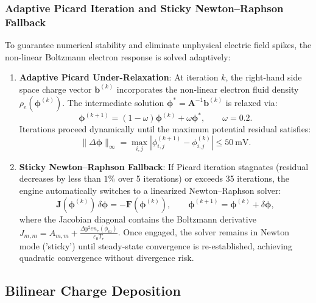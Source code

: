 \documentclass[11pt,a4paper]{article}
\begin{document}
\subsubsection{Adaptive Picard Iteration and Sticky Newton--Raphson Fallback}

To guarantee numerical stability and eliminate unphysical electric field spikes, the non-linear Boltzmann electron response is solved adaptively:
\begin{enumerate}[nosep]
    \item \textbf{Adaptive Picard Under-Relaxation}: At iteration $k$, the right-hand side space charge vector $\mathbf{b}^{(k)}$ incorporates the non-linear electron fluid density $\rho_e(\boldsymbol{\phi}^{(k)})$. The intermediate solution $\boldsymbol{\phi}^* = \mathbf{A}^{-1} \mathbf{b}^{(k)}$ is relaxed via:
    \begin{equation}
        \boldsymbol{\phi}^{(k+1)} = (1 - \omega) \boldsymbol{\phi}^{(k)} + \omega \boldsymbol{\phi}^*, \qquad \omega = 0.2.
    \end{equation}
    Iterations proceed dynamically until the maximum potential residual satisfies:
    \begin{equation}
        \|\Delta \boldsymbol{\phi}\|_{\infty} = \max_{i,j} \left|\phi_{i,j}^{(k+1)} - \phi_{i,j}^{(k)}\right| \le \SI{50}{\milli\volt}.
    \end{equation}
    \item \textbf{Sticky Newton--Raphson Fallback}: If Picard iteration stagnates (residual decreases by less than $1\%$ over 5 iterations) or exceeds 35 iterations, the engine automatically switches to a linearized Newton--Raphson solver:
    \begin{equation}
        \mathbf{J}(\boldsymbol{\phi}^{(k)}) \, \delta \boldsymbol{\phi} = -\mathbf{F}(\boldsymbol{\phi}^{(k)}), \qquad \boldsymbol{\phi}^{(k+1)} = \boldsymbol{\phi}^{(k)} + \delta \boldsymbol{\phi},
    \end{equation}
    where the Jacobian diagonal contains the Boltzmann derivative $J_{m,m} = A_{m,m} + \frac{\Delta y^2 e n_e(\phi_m)}{\varepsilon_0 T_e}$. Once engaged, the solver remains in Newton mode ('sticky') until steady-state convergence is re-established, achieving quadratic convergence without divergence risk.
\end{enumerate}

\subsection{Bilinear Charge Deposition}
\end{document}
